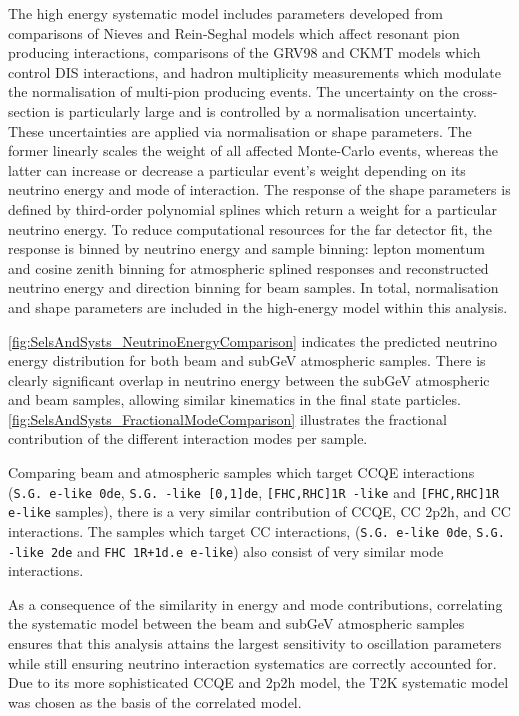 The high energy systematic model includes parameters developed from comparisons of Nieves and Rein-Seghal models which affect resonant pion producing interactions, comparisons of the GRV98 and CKMT models which control DIS interactions, and hadron multiplicity measurements which modulate the normalisation of multi-pion producing events. The uncertainty on the \quickmath{\nu_{\tau}} cross-section is particularly large and is controlled by a  normalisation uncertainty. These uncertainties are applied via normalisation or shape parameters. The former linearly scales the weight of all affected Monte-Carlo events, whereas the latter can increase or decrease a particular event's weight depending on its neutrino energy and mode of interaction. The response of the shape parameters is defined by third-order polynomial splines which return a weight for a particular neutrino energy. To reduce computational resources for the far detector fit, the response is binned by neutrino energy and sample binning: lepton momentum and cosine zenith binning for atmospheric splined responses and reconstructed neutrino energy and direction binning for beam samples. In total,  normalisation and  shape parameters are included in the high-energy model within this analysis.

\autoref{fig:SelsAndSysts_NeutrinoEnergyComparison} indicates the predicted neutrino energy distribution for both beam and subGeV atmospheric samples. There is clearly significant overlap in neutrino energy between the subGeV atmospheric and beam samples, allowing similar kinematics in the final state particles. \autoref{fig:SelsAndSysts_FractionalModeComparison} illustrates the fractional contribution of the different interaction modes per sample.

Comparing beam and atmospheric samples which target CCQE interactions (\texttt{S.G. e-like 0de}, \texttt{S.G. \quickmath{\mu}-like [0,1]de}, \texttt{[FHC,RHC]1R \quickmath{\mu}-like} and \texttt{[FHC,RHC]1R e-like} samples), there is a very similar contribution of CCQE, CC 2p2h, and CC\quickmath{1\pi^{\pm}} interactions. The samples which target CC\quickmath{1\pi^{\pm}} interactions, (\texttt{S.G. e-like 0de}, \texttt{S.G. \quickmath{\mu}-like 2de} and \texttt{FHC 1R+1d.e e-like}) also consist of very similar mode interactions.

As a consequence of the similarity in energy and mode contributions, correlating the systematic model between the beam and subGeV atmospheric samples ensures that this analysis attains the largest sensitivity to oscillation parameters while still ensuring neutrino interaction systematics are correctly accounted for. Due to its more sophisticated CCQE and 2p2h model, the T2K systematic model was chosen as the basis of the correlated model. 

